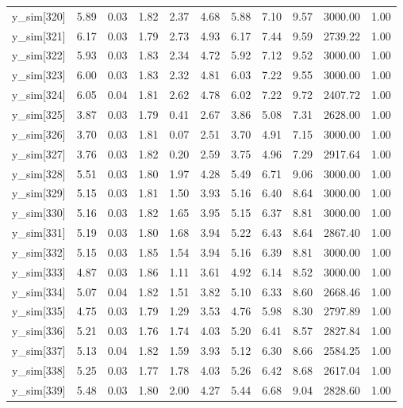\begin{table}[ht]
\begin{tabular}{rrrrrrrrrrr}
  y\_sim[320] & 5.89 & 0.03 & 1.82 & 2.37 & 4.68 & 5.88 & 7.10 & 9.57 & 3000.00 & 1.00 \\ 
  y\_sim[321] & 6.17 & 0.03 & 1.79 & 2.73 & 4.93 & 6.17 & 7.44 & 9.59 & 2739.22 & 1.00 \\ 
  y\_sim[322] & 5.93 & 0.03 & 1.83 & 2.34 & 4.72 & 5.92 & 7.12 & 9.52 & 3000.00 & 1.00 \\ 
  y\_sim[323] & 6.00 & 0.03 & 1.83 & 2.32 & 4.81 & 6.03 & 7.22 & 9.55 & 3000.00 & 1.00 \\ 
  y\_sim[324] & 6.05 & 0.04 & 1.81 & 2.62 & 4.78 & 6.02 & 7.22 & 9.72 & 2407.72 & 1.00 \\ 
  y\_sim[325] & 3.87 & 0.03 & 1.79 & 0.41 & 2.67 & 3.86 & 5.08 & 7.31 & 2628.00 & 1.00 \\ 
  y\_sim[326] & 3.70 & 0.03 & 1.81 & 0.07 & 2.51 & 3.70 & 4.91 & 7.15 & 3000.00 & 1.00 \\ 
  y\_sim[327] & 3.76 & 0.03 & 1.82 & 0.20 & 2.59 & 3.75 & 4.96 & 7.29 & 2917.64 & 1.00 \\ 
  y\_sim[328] & 5.51 & 0.03 & 1.80 & 1.97 & 4.28 & 5.49 & 6.71 & 9.06 & 3000.00 & 1.00 \\ 
  y\_sim[329] & 5.15 & 0.03 & 1.81 & 1.50 & 3.93 & 5.16 & 6.40 & 8.64 & 3000.00 & 1.00 \\ 
  y\_sim[330] & 5.16 & 0.03 & 1.82 & 1.65 & 3.95 & 5.15 & 6.37 & 8.81 & 3000.00 & 1.00 \\ 
  y\_sim[331] & 5.19 & 0.03 & 1.80 & 1.68 & 3.94 & 5.22 & 6.43 & 8.64 & 2867.40 & 1.00 \\ 
  y\_sim[332] & 5.15 & 0.03 & 1.85 & 1.54 & 3.94 & 5.16 & 6.39 & 8.81 & 3000.00 & 1.00 \\ 
  y\_sim[333] & 4.87 & 0.03 & 1.86 & 1.11 & 3.61 & 4.92 & 6.14 & 8.52 & 3000.00 & 1.00 \\ 
  y\_sim[334] & 5.07 & 0.04 & 1.82 & 1.51 & 3.82 & 5.10 & 6.33 & 8.60 & 2668.46 & 1.00 \\ 
  y\_sim[335] & 4.75 & 0.03 & 1.79 & 1.29 & 3.53 & 4.76 & 5.98 & 8.30 & 2797.89 & 1.00 \\ 
  y\_sim[336] & 5.21 & 0.03 & 1.76 & 1.74 & 4.03 & 5.20 & 6.41 & 8.57 & 2827.84 & 1.00 \\ 
  y\_sim[337] & 5.13 & 0.04 & 1.82 & 1.59 & 3.93 & 5.12 & 6.30 & 8.66 & 2584.25 & 1.00 \\ 
  y\_sim[338] & 5.25 & 0.03 & 1.77 & 1.78 & 4.03 & 5.26 & 6.42 & 8.68 & 2617.04 & 1.00 \\ 
  y\_sim[339] & 5.48 & 0.03 & 1.80 & 2.00 & 4.27 & 5.44 & 6.68 & 9.04 & 2828.60 & 1.00 \\ 

\end{tabular}
\end{table}
